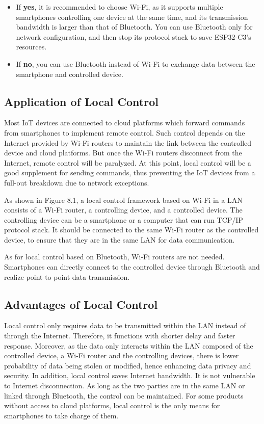 \documentclass[a4paper,12pt,openany]{book}
\begin{document}
\begin{itemize}[leftmargin=1.5em]
    \item If \textbf{yes}, it is recommended to choose Wi-Fi, as it supports multiple smartphones controlling one device at the same time, and its transmission bandwidth is larger than that of Bluetooth. You can use Bluetooth only for network configuration, and then stop its protocol stack to save ESP32-C3’s resources.
    \item If \textbf{no}, you can use Bluetooth instead of Wi-Fi to exchange data between the smartphone and controlled device.
\end{itemize}

\subsection{Application of Local Control}
Most IoT devices are connected to cloud platforms which forward commands from smartphones to implement remote control. Such control depends on the Internet provided by Wi-Fi routers to maintain the link between the controlled device and cloud platforms. But once the Wi-Fi routers disconnect from the Internet, remote control will be paralyzed. At this point, local control will be a good supplement for sending commands, thus preventing the IoT devices from a full-out breakdown due to network exceptions.

As shown in Figure 8.1, a local control framework based on Wi-Fi in a LAN consists of a Wi-Fi router, a controlling device, and a controlled device. The controlling device can be a smartphone or a computer that can run TCP/IP protocol stack. It should be connected to the same Wi-Fi router as the controlled device, to ensure that they are in the same LAN for data communication.

As for local control based on Bluetooth, Wi-Fi routers are not needed. Smartphones can directly connect to the controlled device through Bluetooth and realize point-to-point data transmission.

\subsection{Advantages of Local Control}
Local control only requires data to be transmitted within the LAN instead of through the Internet. Therefore, it functions with shorter delay and faster response. Moreover, as the data only interacts within the LAN composed of the controlled device, a Wi-Fi router and the controlling devices, there is lower probability of data being stolen or modified, hence enhancing data privacy and security.
In addition, local control saves Internet bandwidth. It is not vulnerable to Internet disconnection. As long as the two parties are in the same LAN or linked through Bluetooth, the control can be maintained. For some products without access to cloud platforms, local control is the only means for smartphones to take charge of them.
\end{document}
